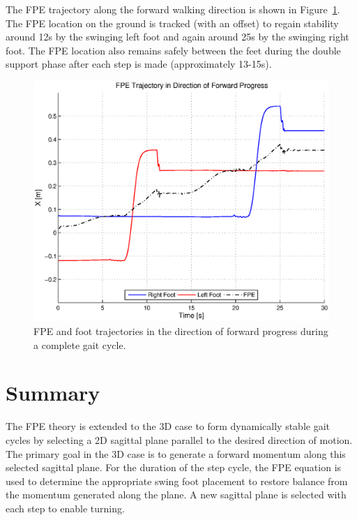The FPE trajectory along the forward walking direction is shown in Figure~\ref{fig:fwdfpetraj}. The FPE location on the ground is tracked (with an offset) to regain stability around 12s by the swinging left foot and again around 25s by the swinging right foot. The FPE location also remains safely between the feet during the double support phase after each step is made (approximately 13-15s). 


\begin{figure}[!t]
	\centering
    \includegraphics[scale=0.7]{fig/simulations/fwdfpetraj.eps}
  	\caption{FPE and foot trajectories in the direction of forward progress during a complete gait cycle.}
	\label{fig:fwdfpetraj}
\end{figure}



\section{Summary} %
\label{sec:simulations_summary}
The FPE theory is extended to the 3D case to form dynamically stable gait cycles by selecting a 2D sagittal plane parallel to the desired direction of motion. The primary goal in the 3D case is to generate a forward momentum along this selected sagittal plane. For the duration of the step cycle, the FPE equation is used to determine the appropriate swing foot placement to restore balance from the momentum generated along the plane. A new sagittal plane is selected with each step to enable turning. 


